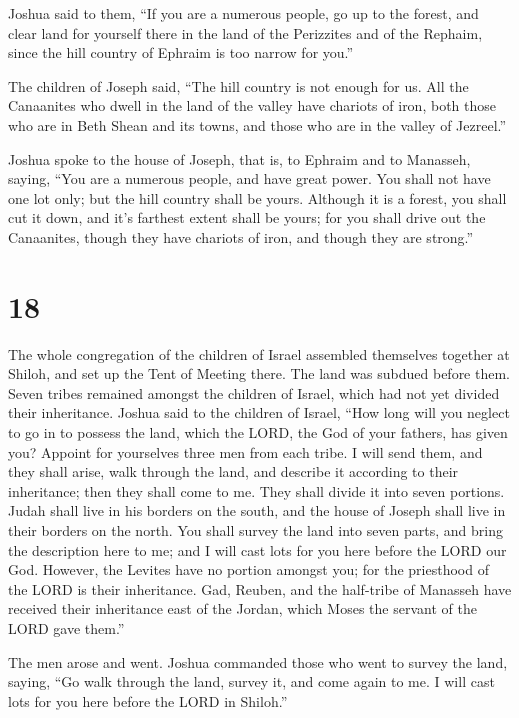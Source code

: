  Joshua said to them, ``If you are a numerous people, go
up to the forest, and clear land for yourself there in the land of the
Perizzites and of the Rephaim, since the hill country of Ephraim is too
narrow for you.''

 The children of Joseph said, ``The hill country is not
enough for us. All the Canaanites who dwell in the land of the valley
have chariots of iron, both those who are in Beth Shean and its towns,
and those who are in the valley of Jezreel.''

 Joshua spoke to the house of Joseph, that is, to Ephraim
and to Manasseh, saying, ``You are a numerous people, and have great
power. You shall not have one lot only;  but the hill
country shall be yours. Although it is a forest, you shall cut it down,
and it's farthest extent shall be yours; for you shall drive out the
Canaanites, though they have chariots of iron, and though they are
strong.''

\hypertarget{section-17}{%
\section{18}\label{section-17}}

 The whole congregation of the children of Israel
assembled themselves together at Shiloh, and set up the Tent of Meeting
there. The land was subdued before them.  Seven tribes
remained amongst the children of Israel, which had not yet divided their
inheritance.  Joshua said to the children of Israel, ``How
long will you neglect to go in to possess the land, which the LORD, the
God of your fathers, has given you?  Appoint for
yourselves three men from each tribe. I will send them, and they shall
arise, walk through the land, and describe it according to their
inheritance; then they shall come to me.  They shall
divide it into seven portions. Judah shall live in his borders on the
south, and the house of Joseph shall live in their borders on the north.
 You shall survey the land into seven parts, and bring the
description here to me; and I will cast lots for you here before the
LORD our God.  However, the Levites have no portion
amongst you; for the priesthood of the LORD is their inheritance. Gad,
Reuben, and the half-tribe of Manasseh have received their inheritance
east of the Jordan, which Moses the servant of the LORD gave them.''

 The men arose and went. Joshua commanded those who went
to survey the land, saying, ``Go walk through the land, survey it, and
come again to me. I will cast lots for you here before the LORD in
Shiloh.''

